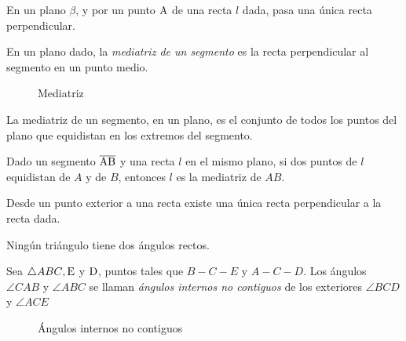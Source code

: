 \begin{theorem}
    En un plano $\beta$, y por un punto $\rm A$ de una recta $l$ dada, pasa una única recta perpendicular.
\end{theorem}

\begin{definition}
    En un plano dado, la \textit{mediatriz de un segmento} es la recta perpendicular al segmento en un punto medio.

    \begin{figure}[!h]
        \centering
        
        \caption{Mediatriz}
        \label{fig:mediatriz}
    \end{figure}
    
\end{definition}

\begin{theorem}
    La mediatriz de un segmento, en un plano, es el conjunto de todos los puntos del plano que equidistan en los extremos del segmento.
\end{theorem}

\begin{theorem}
    Dado un segmento $\overline{\rm AB}$ y una recta $l$ en el mismo plano, si dos puntos de $l$ equidistan de $A$ y de $B$, entonces $l$ es la mediatriz de $AB$.
\end{theorem}

\begin{theorem}
    Desde un punto exterior a una recta existe una única recta perpendicular a la recta dada.
\end{theorem}

\begin{theorem}
    Ningún triángulo tiene dos ángulos rectos.
\end{theorem}

\clearpage

\begin{definition}

Sea $\triangle{ABC}, \rm E$ y $\rm D$, puntos tales que $B-C-E$ y $A-C-D$. Los ángulos $\angle{CAB}$ y $\angle{ABC}$ se llaman \textit{ángulos internos no contiguos} de los exteriores $\angle{BCD}$ y $\angle{ACE}$

    \begin{figure}[!h]
        \centering
        
        \caption{Ángulos internos no contiguos}
        \label{fig:ang-internos-no-contiguos}
    \end{figure}
    
\end{definition}

